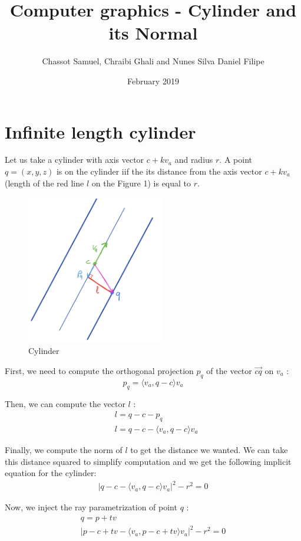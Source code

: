 \documentclass{article}
\title{Computer graphics - Cylinder and its Normal}
\author{Chassot Samuel, Chraibi Ghali and Nunes Silva Daniel Filipe}
\date{February 2019}
\begin{document}
\maketitle

\section{Infinite length cylinder}
Let us take a cylinder with axis vector $c + \textit{k} v_a$ and radius $\textit{r}$. A point $q = (x,y,z)$ is on the cylinder iif the its distance from the axis vector $c + \textit{k} v_a$ (length of the red line $l$ on the Figure 1) is equal to $\textit{r}$.

\begin{figure}[h]
\centering
\includegraphics[width=6cm]{res/Cylinder_sketch.jpeg}
\caption{Cylinder}
\end{figure}

First, we need to compute the orthogonal projection $p_q$ of the vector $\overrightarrow{cq}$ on $v_a$ :
$$p_q = \langle v_a, q-c\rangle  v_a$$

Then, we can compute the vector $l$ :
\begin{align*}
    &l = q-c-p_q \\
    &l = q-c - \langle v_a, q-c\rangle  v_a
\end{align*}

Finally, we compute the norm of $l$ to get the distance we wanted. We can take this distance squared to simplify computation and we get the following implicit equation for the cylinder:
\begin{gather*}
    |q-c-\langle v_a, q-c\rangle  v_a|^2 - r^2 = 0
\end{gather*}

Now, we inject the ray parametrization of point $q$ :
\begin{gather*}
    q=p+tv \\
    |p-c+tv-\langle v_a, p-c+tv\rangle v_a|^2-r^2=0
\end{gather*}
\end{document}
